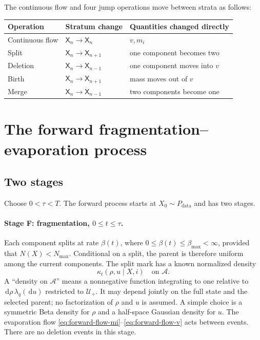 \documentclass[10pt]{article}
\theoremstyle{definition}
\theoremstyle{remark}
\newcommand{\dd}{\,\mathrm{d}}
\newcommand{\state}{\mathsf{X}}
\newcommand{\pdata}{P_{\mathrm{data}}}
\begin{document}
The continuous flow and four jump operations move between strata as follows:
\begin{center}
\begin{tabular}{lll}
\toprule
Operation & Stratum change & Quantities changed directly \\
\midrule
Continuous flow & $\state_n\to\state_n$ & $v,m_i$ \\
Split & $\state_n\to\state_{n+1}$ & one component becomes two \\
Deletion & $\state_n\to\state_{n-1}$ & one component moves into $v$ \\
Birth & $\state_n\to\state_{n+1}$ & mass moves out of $v$ \\
Merge & $\state_n\to\state_{n-1}$ & two components become one \\
\bottomrule
\end{tabular}
\end{center}

\section{The forward fragmentation--evaporation process}
\label{sec:forward}

\subsection{Two stages}

Choose $0<\tau<T$.  The forward process starts at $X_0\sim\pdata$ and has two stages.

\paragraph{Stage F: fragmentation, $0\leq t\leq\tau$.}
Each component splits at rate $\beta(t)$, where
$0\leq\beta(t)\leq\beta_{\max}<\infty$, provided that
$N(X)<N_{\max}$.  Conditional on a split, the parent is therefore uniform
among the current components.  The split mark has a known normalized density
\begin{equation}
  \kappa_t(\rho,u\mid X,i)
  \quad\text{on }\mathcal A.
  \label{eq:split-kernel}
\end{equation}
A ``density on $\mathcal A$'' means a nonnegative function integrating to
one relative to $\dd\rho\,\lambda_q(\dd u)$ restricted to
$\mathcal U_+$.  It may depend jointly on the full state and the selected
parent; no factorization of $\rho$ and $u$ is assumed.
A simple choice is a symmetric Beta density for $\rho$ and a half-space Gaussian density for $u$.  The evaporation flow \eqref{eq:forward-flow-mi}--\eqref{eq:forward-flow-v} acts between events.  There are no deletion events in this stage.
\end{document}
